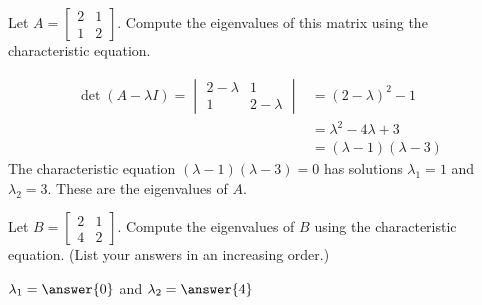 \documentclass{ximera}
\begin{document}
\begin{example}\label{ex:2x2eig}
Let $A=\begin{bmatrix} 2& 1\\ 1&2
\end{bmatrix}$.  Compute the eigenvalues of this matrix using the characteristic equation.
\begin{explanation}
\begin{align*}\det(A-\lambda I)=\begin{vmatrix}2-\lambda&1\\1&2-\lambda\end{vmatrix}&=(2-\lambda)^2-1\\
&=\lambda^2-4\lambda+3\\
&=(\lambda-1)(\lambda-3)
\end{align*}
The characteristic equation $(\lambda-1)(\lambda-3)=0$ has solutions $\lambda_1=1$ and $\lambda_2=3$.  These are the eigenvalues of $A$.
\end{explanation}
\end{example}

\begin{example}\label{ex:2x2eig2}
Let $B=\begin{bmatrix} 2& 1\\ 4&2
\end{bmatrix}$.  Compute the eigenvalues of $B$ using the characteristic equation.  (List your answers in an increasing order.)

$\lambda_1=\answer{0}$ and $\lambda_2=\answer{4}$
\end{example}
\end{document}
